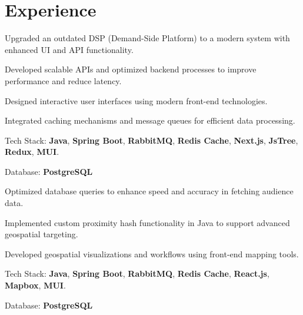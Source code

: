 \documentclass[]{azhagu-swe-resume-openfont}
\begin{document}
\begin{minipage}[t]{0.66\textwidth} 


\section{Experience}

\vspace{\topsep} %
\begin{tightemize}
\item Upgraded an outdated DSP (Demand-Side Platform) to a modern system with enhanced UI and API functionality.
\item Developed scalable APIs and optimized backend processes to improve performance and reduce latency.
\item Designed interactive user interfaces using modern front-end technologies.
\item Integrated caching mechanisms and message queues for efficient data processing.
\item Tech Stack: \textbf{Java}, \textbf{Spring Boot}, \textbf{RabbitMQ}, \textbf{Redis Cache}, \textbf{Next.js}, \textbf{JsTree}, \textbf{Redux}, \textbf{MUI}.
\item Database: \textbf{PostgreSQL}
\end{tightemize}
\sectionsep
{}
\begin{tightemize}
\item Optimized database queries to enhance speed and accuracy in fetching audience data.
\item Implemented custom proximity hash functionality in Java to support advanced geospatial targeting.
\item Developed geospatial visualizations and workflows using front-end mapping tools.
\item Tech Stack: \textbf{Java}, \textbf{Spring Boot}, \textbf{RabbitMQ}, \textbf{Redis Cache}, \textbf{React.js}, \textbf{Mapbox}, \textbf{MUI}.
\item Database:  \textbf{PostgreSQL}
\end{tightemize}
\sectionsep


\end{minipage}
\end{document}
